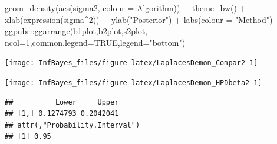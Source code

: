 \documentclass[
]{book}
\newenvironment{Shaded}{\begin{snugshade}}{\end{snugshade}}
\newcommand{\AttributeTok}[1]{\textcolor[rgb]{0.77,0.63,0.00}{#1}}
\newcommand{\ConstantTok}[1]{\textcolor[rgb]{0.00,0.00,0.00}{#1}}
\newcommand{\DecValTok}[1]{\textcolor[rgb]{0.00,0.00,0.81}{#1}}
\newcommand{\FunctionTok}[1]{\textcolor[rgb]{0.00,0.00,0.00}{#1}}
\newcommand{\NormalTok}[1]{#1}
\newcommand{\SpecialCharTok}[1]{\textcolor[rgb]{0.00,0.00,0.00}{#1}}
\newcommand{\StringTok}[1]{\textcolor[rgb]{0.31,0.60,0.02}{#1}}
\begin{document}
\begin{Shaded}
\begin{Highlighting}[]
  \FunctionTok{geom\_density}\NormalTok{(}\FunctionTok{aes}\NormalTok{(sigma2, }\AttributeTok{colour =}\NormalTok{ Algorithm)) }\SpecialCharTok{+} \FunctionTok{theme\_bw}\NormalTok{() }\SpecialCharTok{+}
  \FunctionTok{xlab}\NormalTok{(}\FunctionTok{expression}\NormalTok{(sigma}\SpecialCharTok{\^{}}\DecValTok{2}\NormalTok{)) }\SpecialCharTok{+} \FunctionTok{ylab}\NormalTok{(}\StringTok{"Posterior"}\NormalTok{) }\SpecialCharTok{+} \FunctionTok{labs}\NormalTok{(}\AttributeTok{colour =} \StringTok{"Method"}\NormalTok{)}
\NormalTok{ggpubr}\SpecialCharTok{::}\FunctionTok{ggarrange}\NormalTok{(b1plot,b2plot,s2plot,}
                  \AttributeTok{ncol=}\DecValTok{1}\NormalTok{,}\AttributeTok{common.legend=}\ConstantTok{TRUE}\NormalTok{,}\AttributeTok{legend=}\StringTok{"bottom"}\NormalTok{)}
\end{Highlighting}
\end{Shaded}

\begin{center}\texttt{[image: InfBayes\_files/figure-latex/LaplacesDemon\_Compar2-1]} \end{center}

\begin{Shaded}
\end{Shaded}

\begin{center}\texttt{[image: InfBayes\_files/figure-latex/LaplacesDemon\_HPDbeta2-1]} \end{center}

\begin{verbatim}
##          Lower     Upper
## [1,] 0.1274793 0.2042041
## attr(,"Probability.Interval")
## [1] 0.95
\end{verbatim}
\end{document}
